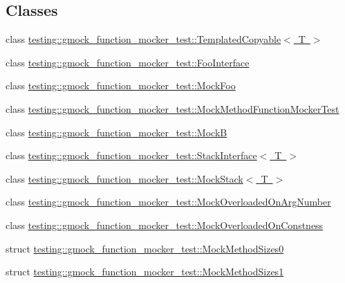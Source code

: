 \subsection*{Classes}
\begin{DoxyCompactItemize}
\item 
class \mbox{\hyperlink{classtesting_1_1gmock__function__mocker__test_1_1_templated_copyable}{testing\+::gmock\+\_\+function\+\_\+mocker\+\_\+test\+::\+Templated\+Copyable$<$ T $>$}}
\item 
class \mbox{\hyperlink{classtesting_1_1gmock__function__mocker__test_1_1_foo_interface}{testing\+::gmock\+\_\+function\+\_\+mocker\+\_\+test\+::\+Foo\+Interface}}
\item 
class \mbox{\hyperlink{classtesting_1_1gmock__function__mocker__test_1_1_mock_foo}{testing\+::gmock\+\_\+function\+\_\+mocker\+\_\+test\+::\+Mock\+Foo}}
\item 
class \mbox{\hyperlink{classtesting_1_1gmock__function__mocker__test_1_1_mock_method_function_mocker_test}{testing\+::gmock\+\_\+function\+\_\+mocker\+\_\+test\+::\+Mock\+Method\+Function\+Mocker\+Test}}
\item 
class \mbox{\hyperlink{classtesting_1_1gmock__function__mocker__test_1_1_mock_b}{testing\+::gmock\+\_\+function\+\_\+mocker\+\_\+test\+::\+MockB}}
\item 
class \mbox{\hyperlink{classtesting_1_1gmock__function__mocker__test_1_1_stack_interface}{testing\+::gmock\+\_\+function\+\_\+mocker\+\_\+test\+::\+Stack\+Interface$<$ T $>$}}
\item 
class \mbox{\hyperlink{classtesting_1_1gmock__function__mocker__test_1_1_mock_stack}{testing\+::gmock\+\_\+function\+\_\+mocker\+\_\+test\+::\+Mock\+Stack$<$ T $>$}}
\item 
class \mbox{\hyperlink{classtesting_1_1gmock__function__mocker__test_1_1_mock_overloaded_on_arg_number}{testing\+::gmock\+\_\+function\+\_\+mocker\+\_\+test\+::\+Mock\+Overloaded\+On\+Arg\+Number}}
\item 
class \mbox{\hyperlink{classtesting_1_1gmock__function__mocker__test_1_1_mock_overloaded_on_constness}{testing\+::gmock\+\_\+function\+\_\+mocker\+\_\+test\+::\+Mock\+Overloaded\+On\+Constness}}
\item 
struct \mbox{\hyperlink{structtesting_1_1gmock__function__mocker__test_1_1_mock_method_sizes0}{testing\+::gmock\+\_\+function\+\_\+mocker\+\_\+test\+::\+Mock\+Method\+Sizes0}}
\item 
struct \mbox{\hyperlink{structtesting_1_1gmock__function__mocker__test_1_1_mock_method_sizes1}{testing\+::gmock\+\_\+function\+\_\+mocker\+\_\+test\+::\+Mock\+Method\+Sizes1}}

\end{DoxyCompactItemize}
